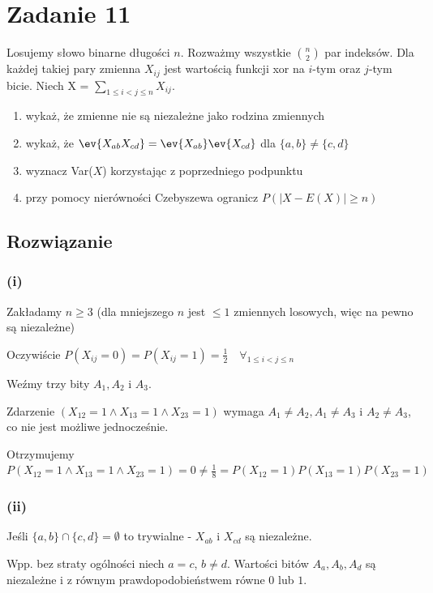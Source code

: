 \section{Zadanie 11}
Losujemy słowo binarne długości \(n\). Rozważmy wszystkie \(\binom{n}2\)
par indeksów. Dla każdej takiej pary zmienna \(X_{ij}\) jest wartością
funkcji xor na \(i\)-tym oraz \(j\)-tym bicie. Niech X =
\(\sum_{1\leqslant i < j \leqslant n} X_{ij}\).

\begin{enumerate}[label=(\roman*)]
	\item wykaż, że zmienne nie są niezależne jako rodzina zmiennych
	\item wykaż, że \(\ev{X_{ab}X_{cd}} =
	      \ev{X_{ab}} \ev{X_{cd}}\) dla
	      \(\{a, b\} \neq \{c, d\}\)
	\item wyznacz Var(\(X\)) korzystając z poprzedniego podpunktu
	\item przy pomocy nierówności Czebyszewa ogranicz
	      \(P(|X-E(X)|\geqslant n)\)
\end{enumerate}

\subsection*{Rozwiązanie}
\subsubsection*{(i)}
Zakładamy \(n \geqslant 3\) (dla mniejszego \(n\) jest \(\leqslant 1\)
zmiennych losowych, więc na pewno są niezależne)

Oczywiście \(P(X_{ij} = 0) = P(X_{ij} = 1) = \frac{1}{2}\quad
\forall_{1\leqslant i < j \leqslant n}\)

Weźmy trzy bity \(A_1, A_2\) i \(A_3\).

Zdarzenie \((X_{12} = 1 \land X_{13} = 1 \land X_{23} = 1)\)
wymaga \(A_1 \neq A_2, A_1 \neq A_3\) i \( A_2 \neq A_3\),
co nie jest możliwe jednocześnie.

Otrzymujemy \(P(X_{12} = 1 \land X_{13} = 1 \land X_{23} = 1) = 0
\neq \frac{1}{8} = P(X_{12} = 1) P(X_{13} = 1) P(X_{23} = 1)\)

\subsubsection*{(ii)}
Jeśli \(\{a, b\} \cap \{c, d\} = \emptyset\) to trywialne - \(X_{ab}\) i \(X_{cd}\)
są niezależne.

Wpp. bez straty ogólności niech \(a = c\), \(b \neq d\).
Wartości bitów \(A_a, A_b, A_d\) są niezależne i z równym prawdopodobieństwem
równe \(0\) lub \(1\).

